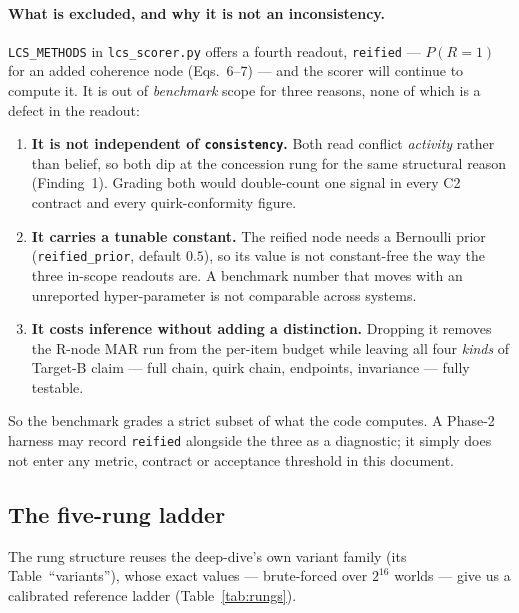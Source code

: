 \documentclass[11pt]{article}
\newcommand{\readout}[1]{\texttt{#1}}
\begin{document}
\paragraph{What is excluded, and why it is not an inconsistency.}
\texttt{LCS\_METHODS} in \texttt{lcs\_scorer.py} offers a fourth readout, \texttt{reified} ---
$P(R{=}1)$ for an added coherence node (Eqs.~6--7) --- and the scorer will continue to compute
it. It is out of \emph{benchmark} scope for three reasons, none of which is a defect in the
readout:

\begin{enumerate}[leftmargin=*,nosep,label=(\arabic*)]
  \item \textbf{It is not independent of \readout{consistency}.} Both read conflict
        \emph{activity} rather than belief, so both dip at the concession rung for the same
        structural reason (Finding~1). Grading both would double-count one signal in every
        C2 contract and every quirk-conformity figure.
  \item \textbf{It carries a tunable constant.} The reified node needs a Bernoulli prior
        (\texttt{reified\_prior}, default $0.5$), so its value is not constant-free the way
        the three in-scope readouts are. A benchmark number that moves with an unreported
        hyper-parameter is not comparable across systems.
  \item \textbf{It costs inference without adding a distinction.} Dropping it removes the
        R-node MAR run from the per-item budget while leaving all four \emph{kinds} of
        Target-B claim --- full chain, quirk chain, endpoints, invariance --- fully testable.
\end{enumerate}

\noindent So the benchmark grades a strict subset of what the code computes. A Phase-2 harness
may record \texttt{reified} alongside the three as a diagnostic; it simply does not enter any
metric, contract or acceptance threshold in this document.

\subsection{The five-rung ladder}
\label{sec:ladder}

The rung structure reuses the deep-dive's own variant family (its Table~``variants''), whose
exact values --- brute-forced over $2^{16}$ worlds --- give us a calibrated reference ladder
(Table~\ref{tab:rungs}).
\end{document}
